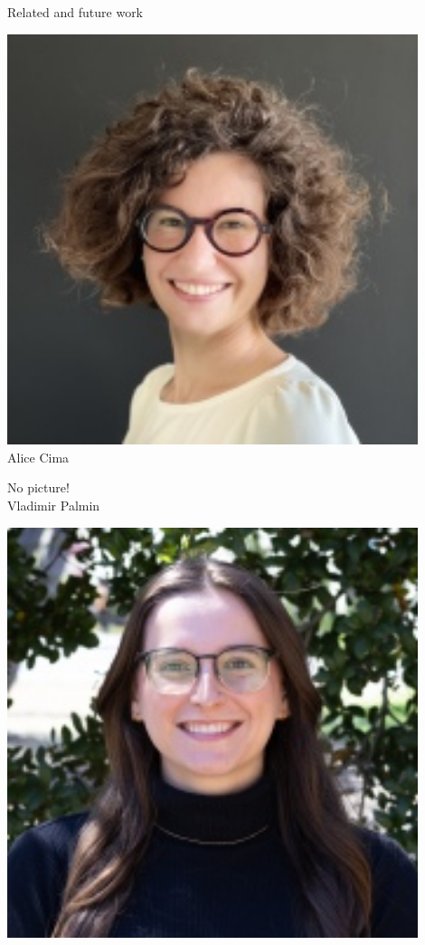 \begin{frame}{Related and future work}
\begin{minipage}[t]{0.24\textwidth}
    \centering
    \includegraphics[width=0.9\textwidth]{static_figures/alice.jpg}\\
    Alice Cima
\end{minipage}
\begin{minipage}[t]{0.24\textwidth}
    \centering
    No picture!\\
    Vladimir Palmin
\end{minipage}
\begin{minipage}[t]{0.24\textwidth}
    \centering
    \includegraphics[width=0.9\textwidth]{static_figures/sequoia.jpg}\\

\end{minipage}
\end{frame}
